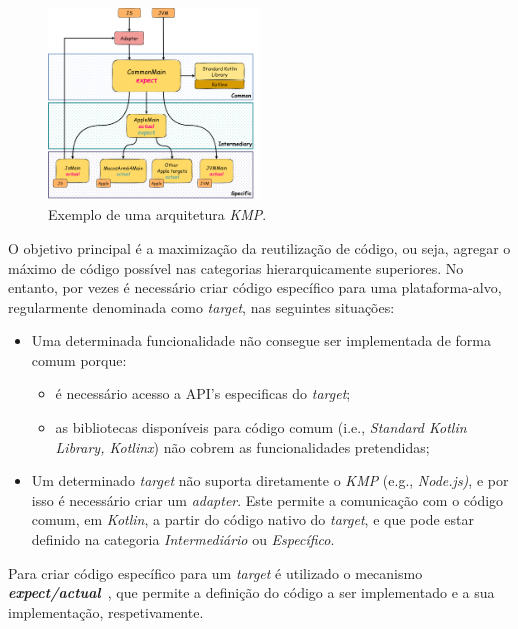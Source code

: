 \begin{figure}[H]
    \centering
    \includegraphics[width=0.5\textwidth]{../docs/imgs/kmp-architecture}
    \caption{Exemplo de uma arquitetura \textit{KMP}.}
    \label{fig:kmp-architecture}
\end{figure}

O objetivo principal é a maximização da reutilização de código, ou seja, agregar o máximo de código possível nas categorias hierarquicamente superiores. No entanto, por vezes é necessário criar código específico para uma plataforma-alvo, regularmente denominada como \textit{target}, nas seguintes situações:

\begin{itemize}[topsep=0pt,itemsep=0pt,partopsep=0pt, parsep=0pt]
    \item Uma determinada funcionalidade não consegue ser implementada de forma comum porque:
    \begin{itemize}[topsep=0pt,itemsep=0pt,partopsep=0pt, parsep=0pt]
        \item é necessário acesso a API's especificas do \textit{target};
        \item as bibliotecas disponíveis para código comum (i.e., \textit{Standard Kotlin Library, Kotlinx}) não cobrem as funcionalidades pretendidas;
    \end{itemize}
    \item Um determinado \textit{target} não suporta diretamente o \textit{KMP} (e.g., \textit{Node.js)}, e por isso é necessário criar um \textit{adapter}.
    Este permite a comunicação com o código comum, em \textit{Kotlin}, a partir do código nativo do \textit{target}, e que pode estar definido na categoria \textit{Intermediário} ou \textit{Específico}.
\end{itemize}

Para criar código específico para um \textit{target} é utilizado o
mecanismo \textbf{\textit{expect/actual}}~\cite{kmp-expect-actual}, que permite a definição do código a ser implementado e a sua implementação, respetivamente.

